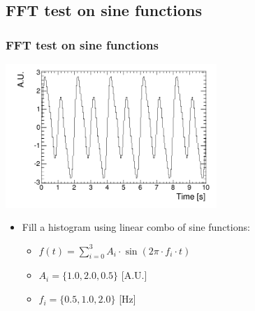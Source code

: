 \documentclass[bigger]{beamer}
\begin{document}
\subsection{FFT test on sine functions}
\label{sec-2-1}
\begin{frame}
\frametitle{FFT test on sine functions}
\label{sec-2-1-1}
\label{sec-2-1-1-1}

\centering
\includegraphics[width=0.6\textwidth]{fig/tutorial_original_histogram.png}
\begin{itemize}

\item Fill a histogram using linear combo of sine functions:
\label{sec-2-1-1-2}%
\begin{itemize}

\item \(f(t) = \sum_{i = 0}^3 A_{i} \cdot \sin (2\pi \cdot f_{i} \cdot t)\)
\label{sec-2-1-1-2-1}%

\item \(A_{i} = \{1.0, 2.0, 0.5\}\) [A.U.]
\label{sec-2-1-1-2-2}%

\item \(f_{i} = \{0.5, 1.0, 2.0\}\) [Hz]
\label{sec-2-1-1-2-3}%
\end{itemize} %
\end{itemize} %
\end{frame}
\end{document}
